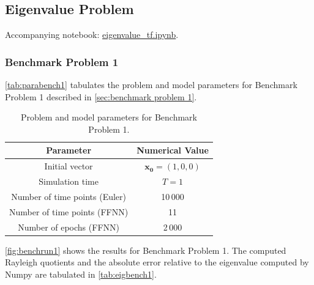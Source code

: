 \subsection{Eigenvalue Problem}\label{sec:eigenvalue results}

Accompanying notebook: \href{https://github.com/nicolossus/FYS-STK4155-Project3/blob/master/notebooks/eigenvalue_tf.ipynb}{eigenvalue\_tf.ipynb}.

\subsubsection{Benchmark Problem 1}

\autoref{tab:parabench1} tabulates the problem and model parameters for Benchmark Problem 1 described in \autoref{sec:benchmark problem 1}. 

\begin{table}[H]
\caption{Problem and model parameters for Benchmark Problem 1.}
\centering
{}
\begin{tabular}{c|c}
\hline
\hline 
Parameter & Numerical Value
\\
\hline 
\hline 
Initial vector & $\bm{x_0}=(1,0,0)$
\\
Simulation time & $T=1$
\\
Number of time points (Euler) & 10\,000
\\
Number of time points (FFNN) & 11
\\
Number of epochs (FFNN) & 2\,000
\\
\hline
\hline 
\end{tabular}
\label{tab:parabench1}
\end{table}


\autoref{fig:benchrun1} shows the results for Benchmark Problem 1. The computed Rayleigh quotients and the absolute error relative to the eigenvalue computed by Numpy are tabulated in \autoref{tab:eigbench1}. 

